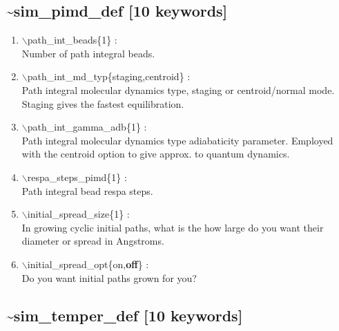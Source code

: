 \documentclass[12pt,titlepage]{article}
\begin{document}
\newpage
\subsection*{\bf \~{}sim\_pimd\_def [10 keywords]}

\begin{enumerate}

 \vspace{0.15in} 
 \item  $\backslash$path\_int\_beads\{1\} : \\
     Number of path integral beads.

 \vspace{0.15in} 
 \item  $\backslash$path\_int\_md\_typ\{staging,centroid\} : \\
     Path integral molecular dynamics type, staging or centroid/normal mode.
     Staging gives the fastest equilibration.

 \vspace{0.15in} 
 \item  $\backslash$path\_int\_gamma\_adb\{1\} : \\
     Path integral molecular dynamics type adiabaticity parameter.
     Employed with the centroid option to give approx. to quantum dynamics.

 \vspace{0.15in} 
 \item  $\backslash$respa\_steps\_pimd\{1\} : \\
     Path integral bead respa steps.

 \vspace{0.15in} 
 \item  $\backslash$initial\_spread\_size\{1\} : \\
    In growing cyclic initial paths, what is the how large do you
    want their diameter or spread in Angstroms.

 \vspace{0.15in} 
 \item  $\backslash$initial\_spread\_opt\{on,{\bf off}\} : \\
    Do you want initial paths grown for you?

\end{enumerate}

\newpage
\newpage
\subsection*{\bf \~{}sim\_temper\_def [10 keywords]}
\end{document}
